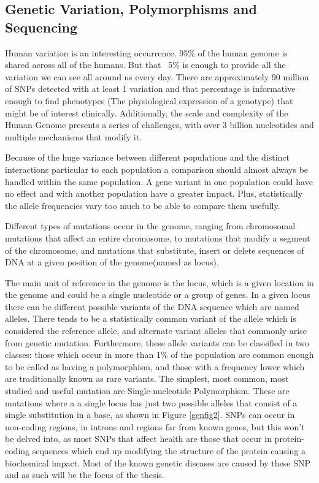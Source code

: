 
\subsection{Genetic Variation, Polymorphisms and Sequencing}

Human variation is an interesting occurrence. 95\% of the human genome is shared across all of the humans. But that ~5\% is enough to provide all the variation we can see all around us every day. There are approximately 90 million of SNPs detected with at least 1 variation and that percentage is informative enough to find phenotypes (The physiological expression of a genotype) that might be of interest clinically. Additionally, the scale and complexity of the Human Genome presents a series of challenges, with over 3 billion nucleotides and multiple mechanisms that modify it.\cite{nussbaum_mcinnes_willard_2016}

Because of the huge variance between different populations and the distinct interactions particular to each population a comparison should almost always be handled within the same population. A gene variant in one population could have no effect and with another population have a greater impact. Plus, statistically the allele frequencies vary too much to be able to compare them usefully.\cite{nussbaum_mcinnes_willard_2016}

Different types of mutations occur in the genome, ranging from chromosomal mutations that affect an entire chromosome, to mutations that modify a segment of the chromosome, and mutations that substitute, insert or delete sequences of DNA at a given position of the genome(named as locus).\cite{nussbaum_mcinnes_willard_2016}


The main unit of reference in the genome is the locus, which is a given location in the genome and could be a single nucleotide or a group of genes. In a given locus there can be different possible variants of the DNA sequence which are named alleles. There tends to be a statistically common variant of the allele which is considered the reference allele, and alternate variant alleles that commonly arise from genetic mutation. Furthermore, these allele variants can be classified in two classes: those which occur in more than 1\% of the population are common enough to be called as having a polymorphism, and those with a frequency lower which are traditionally known as rare variants.\cite{nussbaum_mcinnes_willard_2016}
\newpage
The simplest, most common, most studied and useful mutation are Single-nucleotide Polymorphism. These are mutations where a a single locus has just two possible alleles that consist of a single substitution in a base, as shown in Figure \ref{genfig2}. SNPs can occur in non-coding regions, in introns and regions far from known genes, but this won't be delved into, as most SNPs that affect health are those that occur in protein-coding sequences which end up modifying the structure of the protein causing a biochemical impact. Most of the known genetic diseases are caused by these SNP and as such will be the focus of the thesis.\cite{nussbaum_mcinnes_willard_2016}

